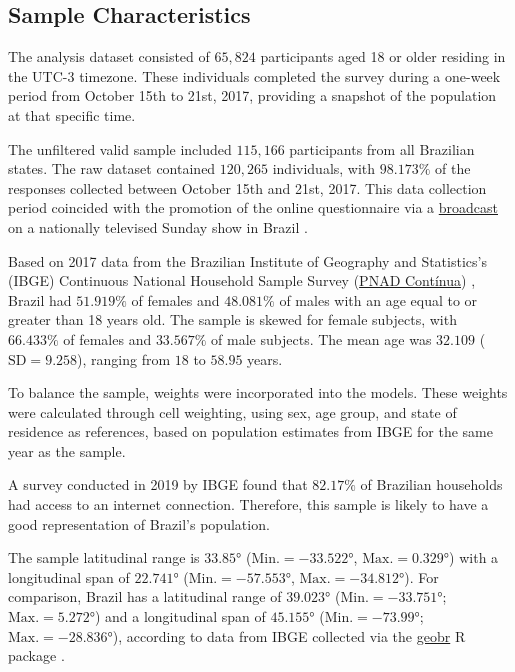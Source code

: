 \documentclass[
12pt,
openright,
oneside,
a4paper,
chapter=TITLE,
section=TITLE,
french,
spanish,
brazil,
english
]{abntex2}
\begin{document}
\subsection{Sample Characteristics}\label{sample-characteristics}

The analysis dataset consisted of \(65,824\) participants aged 18 or
older residing in the UTC-3 timezone. These individuals completed the
survey during a one-week period from October 15th to 21st, 2017,
providing a snapshot of the population at that specific time.

The unfiltered valid sample included \(115,166\) participants from all
Brazilian states. The raw dataset contained \(120,265\) individuals,
with \(98.173\%\) of the responses collected between October 15th and
21st, 2017. This data collection period coincided with the promotion of
the online questionnaire via a
\href{https://globoplay.globo.com/v/6219513/}{broadcast} on a nationally
televised Sunday show in Brazil \autocite{redeglobo2017}.

Based on 2017 data from the Brazilian Institute of Geography and
Statistics's (IBGE) Continuous National Household Sample Survey
(\href{https://www.ibge.gov.br/estatisticas/sociais/trabalho/17270-pnad-continua.html}{PNAD
Contínua}) \autocite{ibgee}, Brazil had \(51.919\%\) of females and
\(48.081\%\) of males with an age equal to or greater than 18 years old.
The sample is skewed for female subjects, with \(66.433\%\) of females
and \(33.567\%\) of male subjects. The mean age was \(32.109\)
(\(\text{SD} = 9.258\)), ranging from \(18\) to \(58.95\) years.

To balance the sample, weights were incorporated into the models. These
weights were calculated through cell weighting, using sex, age group,
and state of residence as references, based on population estimates from
IBGE for the same year as the sample.

A survey conducted in 2019 by IBGE \autocite*{ibge2021} found that
\(82.17\%\) of Brazilian households had access to an internet
connection. Therefore, this sample is likely to have a good
representation of Brazil's population.

The sample latitudinal range is \(33.85°\) (\(\text{Min.} = -33.522°\),
\(\text{Max.} = 0.329°\)) with a longitudinal span of \(22.741°\)
(\(\text{Min.} = -57.553°\), \(\text{Max.} = -34.812°\)). For
comparison, Brazil has a latitudinal range of \(39.023°\)
(\(\text{Min.} = -33.751°\); \(\text{Max.} = 5.272°\)) and a
longitudinal span of \(45.155°\) (\(\text{Min.} = -73.99°\);
\(\text{Max.} = -28.836°\)), according to data from IBGE collected via
the \href{https://ipeagit.github.io/geobr/index.html\%3E}{geobr} R
package \autocite{pereira}.
\end{document}
